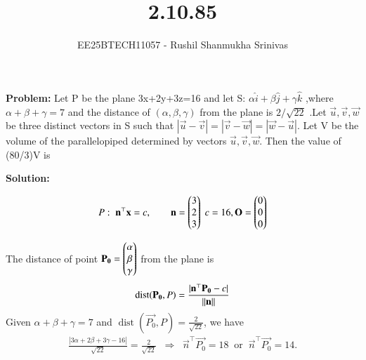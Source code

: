 \documentclass[journal]{IEEEtran}
\begin{document}


\title{2.10.85}
\author{EE25BTECH11057 - Rushil Shanmukha Srinivas
}
{\let\newpage\relax\maketitle}

\renewcommand{\thefigure}{\theenumi}
\renewcommand{\thetable}{\theenumi}
\setlength{\intextsep}{10pt} %

\renewcommand{\thetable}{\theenumi}



\textbf{Problem:} Let P be the plane 3x+2y+3z=16 and let S: $\alpha\hat{i} + \beta\hat{j} + \gamma\hat{k} $ ,where $\alpha+\beta+\gamma=7$ and the distance of $(\alpha,\beta,\gamma)$ from the plane is $2/{\sqrt{22}}$ .Let $\vec{u},\vec{v},\vec{w}$ be three distinct vectors in S such that $|\vec{u}-\vec{v}|=|\vec{v}-\vec{w}|=|\vec{w}-\vec{u}|$. Let V be the volume of the parallelopiped determined by vectors $\vec{u},\vec{v},\vec{w}$. Then the value of (80/3)V is 

\textbf{Solution:}

\begin{align}
P:\; \mathbf{n}^\top \mathbf{x} = c,\qquad \mathbf{n}=\begin{pmatrix}3\\2\\3\end{pmatrix}\;c=16, \mathbf{O}=\begin{pmatrix}0\\0\\0\end{pmatrix}
\end{align}

The distance of point $\mathbf{P_0}=\begin{pmatrix}\alpha\\ \beta\\ \gamma\end{pmatrix}$ from the plane is
\begin{align}
\operatorname{dist}(\mathbf{P_0},P)=\frac{|\mathbf{n}^\top \mathbf{P_0} - c|}{\left\lVert\mathbf{n}\right\rVert}
\end{align}
Given $\alpha+\beta+\gamma=7$ and $\operatorname{dist}(\vec{P_0},P)=\tfrac{2}{\sqrt{22}}$, we have
\begin{align}
\frac{|3\alpha+2\beta+3\gamma-16|}{\sqrt{22}}=\frac{2}{\sqrt{22}}
\;\;\Longrightarrow\;\; \vec{n}^\top \vec{P_0}=18 \;\;\text{or}\;\; \vec{n}^\top \vec{P_0}=14.
\end{align}
\end{document}
